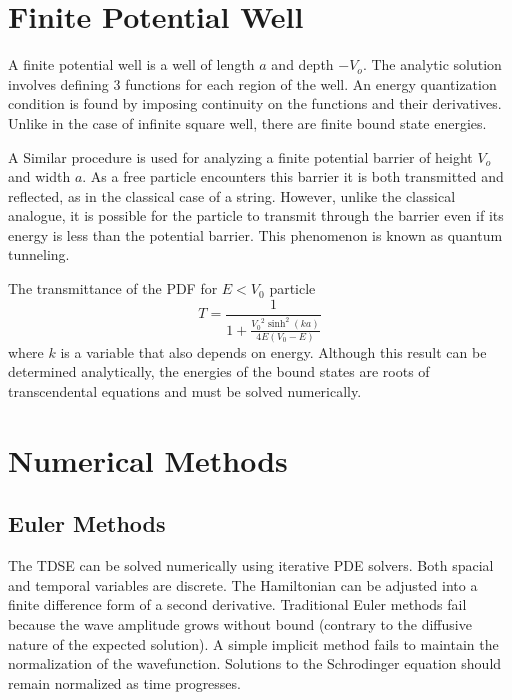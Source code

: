 \documentclass[twoside,twocolumn]{article}
\begin{document}
\section{Finite Potential Well}
A finite potential well is a well of length $a$ and depth $-V_o$. The analytic solution involves defining 3 functions for each region of the well. An energy quantization condition is found by imposing continuity on the functions and their derivatives. Unlike in the case of infinite square well, there are finite bound state energies.

A Similar procedure is used for analyzing a finite potential barrier of height $V_o$ and width $a$. As a free particle encounters this barrier it is both transmitted and reflected, as in the classical case of a string. However, unlike the classical analogue, it is possible for the particle to transmit through the barrier even if its energy is less than the potential barrier. This phenomenon is known as quantum tunneling.

The transmittance of the PDF for $ E < V_0$ particle \cite{q1}
\begin{equation}
	T = \frac{1}{1 + \frac{{V_0}^2\sinh^2(k a)}{4E(V_0 - E)}}
\end{equation}
where $k$ is a variable that also depends on energy. Although this result can be determined analytically, the energies of the bound states are roots of transcendental equations and must be solved numerically.

\section{Numerical Methods}
\subsection{Euler Methods}
The TDSE can be solved numerically using iterative PDE solvers. Both spacial and temporal variables are discrete. The Hamiltonian can be adjusted into a finite difference form of a second derivative. Traditional Euler methods fail because the wave amplitude grows without bound (contrary to the diffusive nature of the expected solution). A simple implicit method fails to maintain the normalization of the wavefunction. Solutions to the Schrodinger equation should remain normalized as time progresses.
\end{document}

